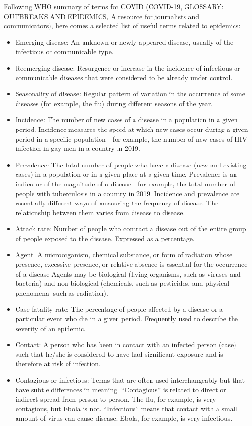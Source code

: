 Following WHO summary of terms for COVID (COVID-19, GLOSSARY: OUTBREAKS AND EPIDEMICS, A resource for journalists and communicators), here comes a selected list of useful terms related to epidemics:
\begin{itemize}
\item Emerging disease: An unknown or newly appeared disease, usually of the infectious or communicable type.
\item Reemerging disease: Resurgence or increase in the incidence of infectious or
communicable diseases that were considered to be already under control.
\item Seasonality of disease: Regular pattern of variation in the occurrence of some diseases
(for example, the flu) during different seasons of the year.
\item Incidence: The number of new cases of a disease in a population in a given period.
Incidence measures the speed at which new cases occur during a given period in a specific
population—for example, the number of new cases of HIV infection in gay men in a country in 2019.
 \item Prevalence: The total number of people who have a disease (new and existing cases)
in a population or in a given place at a given time. Prevalence is an indicator of the
magnitude of a disease—for example, the total number of people with tuberculosis in
a country in 2019. Incidence and prevalence are essentially different ways of measuring
the frequency of disease. The relationship between them varies from disease to disease.
\item Attack rate: Number of people who contract a disease out of the entire group of people exposed to the disease. Expressed as a percentage.
\item Agent: A microorganism, chemical substance, or form of radiation whose
presence, excessive presence, or relative absence is essential for the occurrence of
a disease Agents may be biological (living organisms, such as viruses and bacteria) and
non-biological (chemicals, such as pesticides, and physical phenomena, such as radiation).
\item Case-fatality rate: The percentage of people affected by a disease or a particular event who die in a given period. Frequently used to describe the severity of an epidemic.
\item Contact: A person who has been in contact with an infected person (case) such that he/she is considered to have had significant exposure and is therefore at risk of infection.
\item Contagious or infectious: Terms that are often used interchangeably but that have subtle differences in meaning. “Contagious” is related to direct or indirect spread from person to person. The flu, for example, is very contagious, but Ebola is not. “Infectious” means that contact with a small amount of virus can cause disease. Ebola, for example, is very infectious.

\end{itemize}
